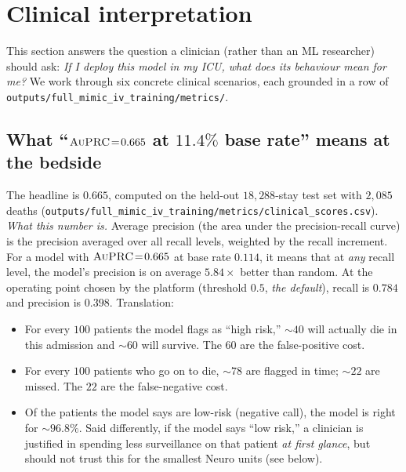 \section{Clinical interpretation}
\label{sec:clinical}

This section answers the question a clinician (rather than an ML researcher)
should ask: \textit{If I deploy this model in my ICU, what does its behaviour
mean for me?} We work through six concrete clinical scenarios, each grounded
in a row of \texttt{outputs/full\_mimic\_iv\_training/metrics/}.

\subsection{What ``$\textsc{AuPRC}{}\!=\!0.665$ at $11.4\%$ base rate'' means at the bedside}
The headline \auprc{} is $0.665$, computed on the held-out $18{,}288$-stay
test set with $2{,}085$ deaths
(\texttt{outputs/full\_mimic\_iv\_training/metrics/clinical\_scores.csv}).
\emph{What this number is.} Average precision (the area under the
precision-recall curve) is the precision averaged over all recall levels,
weighted by the recall increment. For a model with $\textsc{AuPRC}{}\!=\!0.665$ at
base rate $0.114$, it means that at \emph{any} recall level, the model's
precision is on average $5.84\!\times$ better than random. At the operating
point chosen by the platform (threshold $0.5$, \emph{the default}), recall is
$0.784$ and precision is $0.398$. Translation:
\begin{itemize}[leftmargin=*,nosep]
    \item For every $100$ patients the model flags as ``high risk,''
        $\sim 40$ will actually die in this admission and $\sim 60$ will
        survive. The $60$ are the false-positive cost.
    \item For every $100$ patients who go on to die, $\sim 78$ are flagged
        in time; $\sim 22$ are missed. The $22$ are the false-negative cost.
    \item Of the patients the model says are low-risk (negative call), the
        model is right for $\sim 96.8\%$. Said differently, if the model
        says ``low risk,'' a clinician is justified in spending less surveillance
        on that patient \emph{at first glance}, but should not trust this
        for the smallest Neuro units (see below).
\end{itemize}

